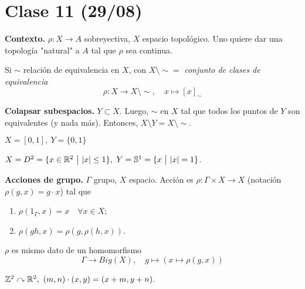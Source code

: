 \section{Clase 11 (29/08)}

\noindent \textbf{Contexto.} $\rho:X \to A$ sobreyectiva, $X$ espacio topológico. Uno quiere dar una topología "natural" a $A$ tal que $\rho$ sea continua.

\begin{eg}[estándar]
	Si $\sim$ relación de equivalencia en $X$, con $X \setminus \sim =$ \textit{conjunto de clases de equivalencia}
	\[ \rho : X \to X \setminus \sim,\quad x \mapsto [x]_{\sim} \]
\end{eg}

\begin{eg}[1.] 
	\textbf{Colapsar subespacios.} $Y \subset X$. Luego, $\sim$ en $X$ tal que todos los puntos de $Y$ son equivalentes (y nada más). Entonces, $X \setminus Y = X \setminus \sim$. \newline
\end{eg}

\begin{eg}[1.1]
	$X = [0,1],\ Y = \{0,1\}$ \newline
\end{eg}

\begin{eg}[1.2]
	$X = D^2 = \{x\in\mathbb{R}^2 \ \big| \ |x|\leq 1 \},\ Y = \mathbb{S}^1 = \{x \ \big| \ |x| = 1\}$. \newline
\end{eg}

\begin{eg}[2.]
	\textbf{Acciones de grupo.} $\Gamma$ grupo, $X$ espacio. Acción es $\rho : \Gamma \times X \to X$ (notación $\rho(g,x) = g\cdot x$) tal que
	\begin{enumerate}
		\item $\rho(1_{\Gamma},x) = x \quad \forall x \in X$;

		\item $\rho(gh,x) = \rho(g,\rho(h,x))$.
	\end{enumerate}
\end{eg}

\begin{observe}
	$\rho$ es mismo dato de un homomorfismo
	\[ \Gamma \to Biy(X),\quad g \mapsto (x \mapsto \rho(g,x)) \]
\end{observe}

\begin{eg}
	$\Z^2 \curvearrowright \R^2,\ (m,n)\cdot(x,y) = (x+m,y+n)$.
\end{eg}

